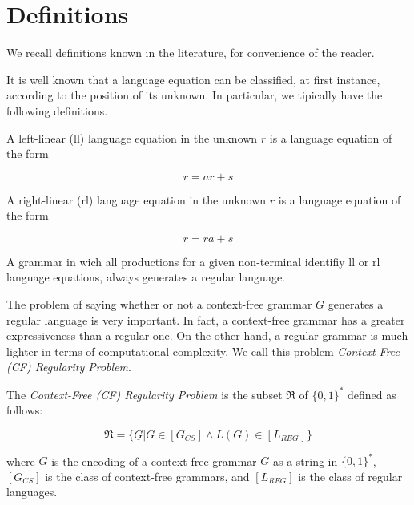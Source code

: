 \section{Definitions}
\label{sec:definitions}

We recall definitions known in the literature, for convenience of the reader.

It is well known that a language equation can be classified, at first instance, according to the position of its unknown. 
In  particular, we tipically have the following definitions.

\begin{definition}
	\label{dfn:ll-language-equation}
	A left-linear (ll) language equation in the unknown $r$ is a language equation of the form
	
	\begin{equation}
	\label{eqn:ll-language}
	r=ar+s
	\end{equation}
\end{definition}

\begin{definition}
	\label{dfn:rl-language-equation}
	A right-linear (rl) language equation in the unknown $r$ is a language equation of the form
	
	\begin{equation}
	\label{eqn:rl-language}
	r=ra+s
	\end{equation}
\end{definition}

A grammar in wich all productions for a given non-terminal identifiy ll or rl language equations, always generates a regular language.

The problem of saying whether or not a context-free grammar $G$ generates a regular language is very important. 
In fact, a context-free grammar has a greater expressiveness than a regular one. 
On the other hand, a regular grammar is much lighter in terms of computational complexity. 
We call this problem \textit{Context-Free (CF) Regularity Problem}.

\begin{definition}
	\label{dfn:cf-regularity-problem}
	The \textit{Context-Free (CF) Regularity Problem} is the subset $\Re$ of $\{0,1\}^{*}$ defined as follows:
	
	\begin{equation}
	\label{eqn:cf-regularity-problem}
	\Re=\{\underline{G}|G\in[G_{CS}]\wedge L(G)\in[L_{REG}]\}
	\end{equation}
	
	where $\underline{G}$ is the encoding of a context-free grammar $G$ as a string in $\{0,1\}^{*}$, $[G_{CS}]$ is the class of context-free grammars, and $[L_{REG}]$ is the class of regular languages.
\end{definition}

